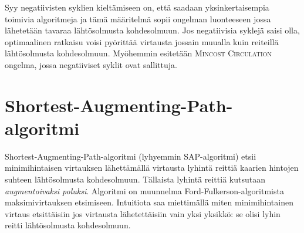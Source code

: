 \documentclass[a4paper, 11pt]{article}
\begin{document}
\noindent
Syy negatiivisten syklien kieltämiseen on, että saadaan yksinkertaisempia toimivia
algoritmeja ja tämä määritelmä sopii ongelman luonteeseen
jossa lähetetään tavaraa lähtösolmusta kohdesolmuun. Jos negatiivisia syklejä saisi
olla, optimaalinen ratkaisu voisi pyörittää virtausta jossain muualla kuin reiteillä
lähtösolmusta kohdesolmuun. Myöhemmin esitetään \textsc{Mincost Circulation} ongelma, jossa
negatiiviset syklit ovat sallittuja.

\section*{Shortest-Augmenting-Path-algoritmi}
Shortest-Augmenting-Path-algoritmi (lyhyemmin SAP-algoritmi) etsii
minimihintaisen virtauksen lähettämällä
virtausta lyhintä reittiä kaarien hintojen suhteen lähtösolmusta kohdesolmuun.
Tällaista lyhintä reittiä kutsutaan \textit{augmentoivaksi poluksi}. Algoritmi 
on muunnelma Ford-Fulkerson-algoritmista 
maksimivirtauksen etsimiseen. Intuitiota saa miettimällä miten minimihintainen virtaus
etsittäisiin
jos virtausta lähetettäisiin vain yksi yksikkö: se olisi lyhin reitti lähtösolmusta
kohdesolmuun.
\noindent
\end{document}
